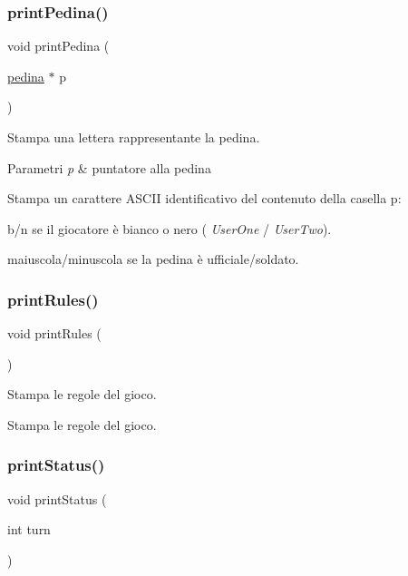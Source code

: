 \subsubsection{\texorpdfstring{print\+Pedina()}{printPedina()}}
{\footnotesize\ttfamily void print\+Pedina (\begin{DoxyParamCaption}\item[{\hyperlink{ml__lib_8h_a71fee95122b31f5cb0b07d9c16ffa3a5}{pedina} $\ast$}]{p }\end{DoxyParamCaption})}



Stampa una lettera rappresentante la pedina. 


\begin{DoxyParams}{Parametri}
{\em p} & puntatore alla pedina\\
\hline
\end{DoxyParams}
Stampa un carattere A\+S\+C\+II identificativo del contenuto della casella p\+: 
\begin{DoxyItemize}
\item b/n se il giocatore è bianco o nero ( {\itshape User\+One} / {\itshape User\+Two}). 
\item maiuscola/minuscola se la pedina è ufficiale/soldato. 
\end{DoxyItemize}\mbox{\label{group__Output_gafa3767d5c549d555cf1817fe57c614fc}} 
\subsubsection{\texorpdfstring{print\+Rules()}{printRules()}}
{\footnotesize\ttfamily void print\+Rules (\begin{DoxyParamCaption}{ }\end{DoxyParamCaption})}



Stampa le regole del gioco. 

Stampa le regole del gioco. \mbox{\label{group__Output_gab1b6c72fb86f8d1c4537fec2456e4c78}} 
\subsubsection{\texorpdfstring{print\+Status()}{printStatus()}}
{\footnotesize\ttfamily void print\+Status (\begin{DoxyParamCaption}\item[{int}]{turn }\end{DoxyParamCaption})}



